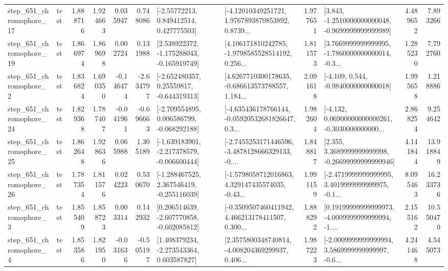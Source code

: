 \begin{tabular}{llrrrrllrlrr}
  step\_651\_chromophore\_17 &      test &      1.888716 &    1.924663 &      0.035947 &  0.748086 &     [-2.55772213, 0.849412514, 0.427775503] &  [-4.12010349251721, 1.9767893870853892, 0.8739... &       1.977651 &  [3.843, -1.2510000000000048, -0.9699999999999989] &            4.489652 &          7.893266 \\
  step\_651\_chromophore\_19 &      test &      1.866974 &    1.869698 &      0.002724 &  0.131988 &   [2.538922372, -1.175288043, -0.165919749] &  [4.106171810242785, -1.9798585528514192, 0.256... &       1.811573 &  [3.7669999999999995, -1.7860000000000014, -0.3... &            1.285230 &          7.792760 \\
   step\_651\_chromophore\_2 &      test &      1.836824 &    1.690350 &     -0.146474 & -2.634797 &    [-2.652480357, 0.25559817, -0.644319313] &  [4.6267710300178635, -0.686613573788557, 1.184... &       2.091618 &               [-4.109, 0.544, -0.9840000000000018] &            1.995658 &          1.218886 \\
  step\_651\_chromophore\_24 &      test &      1.829368 &    1.787407 &     -0.041961 & -0.696663 &   [-2.709554895, 0.006586799, -0.068292188] &  [-4.635436178766144, -0.05920532681826647, 0.3... &       1.982604 &  [-4.132, 0.06900000000000261, -0.3030000000000... &            2.868254 &          9.254642 \\
  step\_651\_chromophore\_25 &      test &      1.862648 &    1.928636 &      0.065988 &  1.305189 &  [-1.639183901, -2.217378579, -0.006600444] &  [-2.7455253171446596, -3.4878128666329133, -0.... &       1.848817 &  [2.355, 3.3689999999999998, -0.26699999999999946] &            4.141844 &         13.918849 \\
  step\_651\_chromophore\_26 &      test &      1.787354 &    1.811576 &      0.024223 &  0.530670 &   [-1.288467525, 2.367546419, -0.255116039] &  [-1.5798058712016863, 4.329147435574035, -0.43... &       1.991159 &  [-2.4719999999999995, 3.4019999999999975, -0.1... &            8.095463 &         16.233736 \\
   step\_651\_chromophore\_3 &      test &      1.855409 &    1.858723 &      0.003314 &  0.142932 &   [0.206514639, -2.607770858, -0.602085812] &  [-0.3509507460411942, 4.466213178411507, 0.300... &       1.888292 &  [0.19199999999999973, -4.0009999999999994, -1.... &            2.155162 &         10.550470 \\
   step\_651\_chromophore\_4 &      test &      1.853586 &    1.821950 &     -0.031636 & -0.505197 &    [1.408379234, -2.273543364, 0.603587827] &  [2.3575800348740814, -4.008204369299937, 0.406... &       1.987223 &  [-2.0009999999999994, 3.5869999999999997, -0.6... &            4.241468 &          4.545073 \\

\end{tabular}
